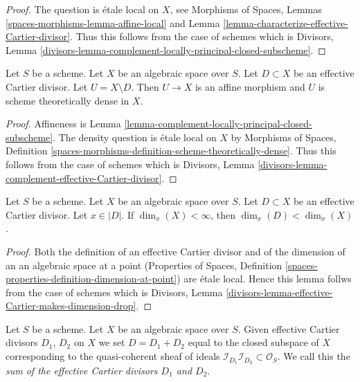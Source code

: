 \begin{proof}
The question is \'etale local on $X$, see
Morphisms of Spaces, Lemmas \ref{spaces-morphisms-lemma-affine-local}
and
Lemma \ref{lemma-characterize-effective-Cartier-divisor}.
Thus this follows from the case of schemes which is
Divisors, Lemma
\ref{divisors-lemma-complement-locally-principal-closed-subscheme}.
\end{proof}

\begin{lemma}
\label{lemma-complement-effective-Cartier-divisor}
Let $S$ be a scheme. Let $X$ be an algebraic space over $S$.
Let $D \subset X$ be an effective Cartier divisor.
Let $U = X \setminus D$. Then $U \to X$ is an affine morphism and $U$
is scheme theoretically dense in $X$.
\end{lemma}

\begin{proof}
Affineness is Lemma \ref{lemma-complement-locally-principal-closed-subscheme}.
The density question is \'etale local on $X$ by
Morphisms of Spaces, Definition
\ref{spaces-morphisms-definition-scheme-theoretically-dense}.
Thus this follows from the case of schemes which is
Divisors, Lemma
\ref{divisors-lemma-complement-effective-Cartier-divisor}.
\end{proof}

\begin{lemma}
\label{lemma-effective-Cartier-makes-dimension-drop}
Let $S$ be a scheme. Let $X$ be an algebraic space over $S$.
Let $D \subset X$ be an effective Cartier divisor.
Let $x \in |D|$.
If $\dim_x(X) < \infty$, then $\dim_x(D) < \dim_x(X)$.
\end{lemma}

\begin{proof}
Both the definition of an effective Cartier divisor and of the
dimension of an an algebraic space at a point
(Properties of Spaces, Definition
\ref{spaces-properties-definition-dimension-at-point})
are \'etale local. Hence this lemma follws from the case of schemes
which is
Divisors, Lemma \ref{divisors-lemma-effective-Cartier-makes-dimension-drop}.
\end{proof}

\begin{definition}
\label{definition-sum-effective-Cartier-divisors}
Let $S$ be a scheme. Let $X$ be an algebraic space over $S$.
Given effective Cartier divisors
$D_1$, $D_2$ on $X$ we set $D = D_1 + D_2$ equal to the
closed subspace of $X$ corresponding to the quasi-coherent
sheaf of ideals
$\mathcal{I}_{D_1}\mathcal{I}_{D_2} \subset \mathcal{O}_S$.
We call this the {\it sum of the effective Cartier divisors
$D_1$ and $D_2$}.
\end{definition}

